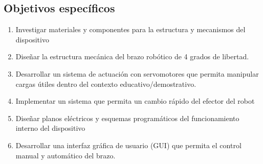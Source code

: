 \subsection{Objetivos específicos}
\begin{enumerate}
  
  \item Investigar materiales y componentes para la estructura y mecanismos del dispositivo
  
  \item Diseñar la estructura mecánica del brazo robótico de 4 grados de libertad.
  
  \item Desarrollar un sistema de actuación con servomotores que permita manipular cargas útiles dentro del contexto educativo/demostrativo.

  \item Implementar un sistema que permita un cambio rápido del efector del robot

  \item Diseñar planos eléctricos y esquemas programáticos del funcionamiento interno del dispositivo 

  \item Desarrollar una interfaz gráfica de usuario (GUI) que permita el control manual y automático del brazo.
\end{enumerate}


